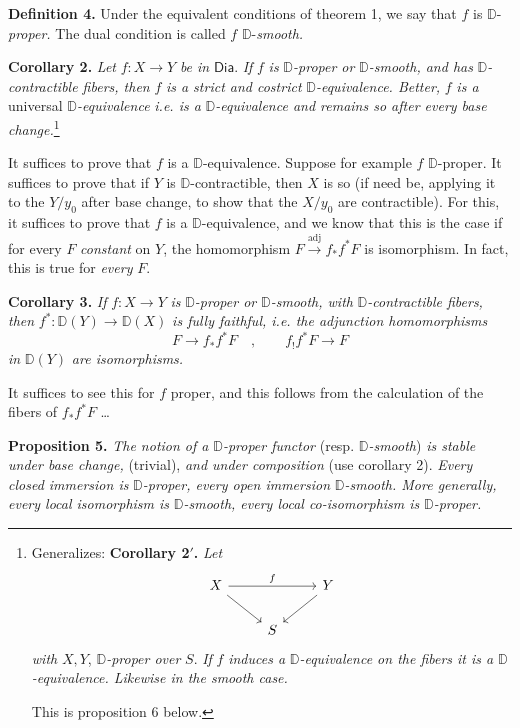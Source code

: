 \documentclass[11pt]{article}
\newcommand{\printedpage}[1]{\marginpar{\footnotesize p.~#1}}
\newcommand{\msp}[1]{\marginpar{\footnotesize [#1]}}
\newcommand{\D}{\mathbb{D}}
\newcommand{\Dia}{\mathsf{Dia}}
\begin{document}
\noindent\textbf{Definition 4.} Under the equivalent conditions of theorem 1, we say that $f$ is $\D$-\textit{proper.} The dual condition is called $f$ $\D$-\textit{smooth.}

\noindent\textbf{Corollary 2.} \textit{Let} $f : X \to Y$ \textit{be in} $\Dia$. \textit{If} $f$ \textit{is} $\D$\textit{-proper or} $\D$\textit{-smooth, and has} $\D$\textit{-contractible fibers, then} $f$ \textit{is a strict and costrict} $\D$\textit{-equivalence. Better,} $f$ \textit{is a} universal $\D$\textit{-equivalence} \textit{i.e. is a} $\D$\textit{-equivalence and remains so after every base change.}\footnote[31]{Generalizes: \textbf{Corollary 2$'$.} \textit{Let}
\[
\begin{tikzcd}[ampersand replacement=\&]
X \arrow[rr, "f"] \arrow[dr] \& \& Y \arrow[dl] \\
\& S \&
\end{tikzcd}
\]
\textit{with} $X, Y$, $\D$\textit{-proper over} $S$. \textit{If} $f$ \textit{induces a} $\D$\textit{-equivalence on the fibers it is a} $\D$\textit{-equivalence. Likewise in the smooth case.}\par
This is proposition 6 below.}

\printedpage{42}
\msp{page 71}

\noindent It suffices to prove that $f$ is a $\D$-equivalence. Suppose for example $f$ $\D$-proper. It suffices to prove that if $Y$ is $\D$-contractible, then $X$ is so (if need be, applying it to the $Y/y_0$ after base change, to show that the $X/y_0$ are contractible). For this, it suffices to prove that $f$ is a $\D$-equivalence, and we know that this is the case if for every $F$ \textit{constant} on $Y$, the homomorphism $F \overset{\text{adj}}{\longrightarrow} f_*f^*F$ is isomorphism. In fact, this is true for \textit{every} $F$.

\noindent\textbf{Corollary 3.} \textit{If} $f : X \to Y$ \textit{is} $\D$\textit{-proper or} $\D$\textit{-smooth, with} $\D$\textit{-contractible fibers, then} $f^* : \D(Y) \to \D(X)$ \textit{is fully faithful, i.e. the adjunction homomorphisms}
\[
F \longrightarrow f_*f^*F \quad , \qquad f_!f^*F \longrightarrow F
\]
\textit{in} $\D(Y)$ \textit{are isomorphisms.}

\noindent It suffices to see this for $f$ proper, and this follows from the calculation of the fibers of $f_*f^*F$ \ldots

\noindent\textbf{Proposition 5.} \textit{The notion of a} $\D$\textit{-proper functor} (resp. $\D$\textit{-smooth}) \textit{is stable under base change,} (trivial), \textit{and under composition} (use corollary 2). \textit{Every closed immersion is} $\D$\textit{-proper, every open immersion} $\D$\textit{-smooth. More generally, every local isomorphism is} $\D$\textit{-smooth, every local co-isomorphism is} $\D$\textit{-proper.}
\end{document}
